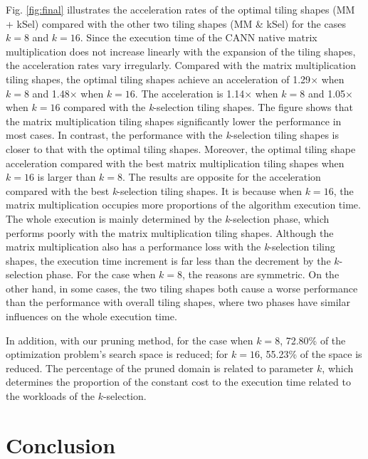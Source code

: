 Fig. \ref{fig:final} illustrates the acceleration rates of the optimal tiling shapes (MM + kSel) compared with the other two tiling shapes (MM \& kSel) for the cases $k = 8$ and $k = 16$. Since the execution time of the CANN native matrix multiplication does not increase linearly with the expansion of the tiling shapes, the acceleration rates vary irregularly. Compared with the matrix multiplication tiling shapes, the optimal tiling shapes achieve an acceleration of 1.29$\times$ when $k = 8$ and 1.48$\times$ when $k = 16$. The acceleration is 1.14$\times$ when $k = 8$ and 1.05$\times$ when $k = 16$ compared with the \textit{k}-selection tiling shapes. The figure shows that the matrix multiplication tiling shapes significantly lower the performance in most cases. In contrast, the performance with the \textit{k}-selection tiling shapes is closer to that with the optimal tiling shapes. Moreover, the optimal tiling shape acceleration compared with the best matrix multiplication tiling shapes when $k = 16$ is larger than $k = 8$. The results are opposite for the acceleration compared with the best \textit{k}-selection tiling shapes. It is because when $k = 16$, the matrix multiplication occupies more proportions of the algorithm execution time. The whole execution is mainly determined by the \textit{k}-selection phase, which performs poorly with the matrix multiplication tiling shapes. Although the matrix multiplication also has a performance loss with the \textit{k}-selection tiling shapes, the execution time increment is far less than the decrement by the $k$-selection phase. For the case when $k = 8$, the reasons are symmetric. On the other hand, in some cases, the two tiling shapes both cause a worse performance than the performance with overall tiling shapes, where two phases have similar influences on the whole execution time.

In addition, with our pruning method, for the case when $k = 8$, 72.80\% of the optimization problem's search space is reduced; for $k = 16$, 55.23\% of the space is reduced. The percentage of the pruned domain is related to parameter $k$, which determines the proportion of the constant cost to the execution time related to the workloads of the $k$-selection.

\section{Conclusion}

